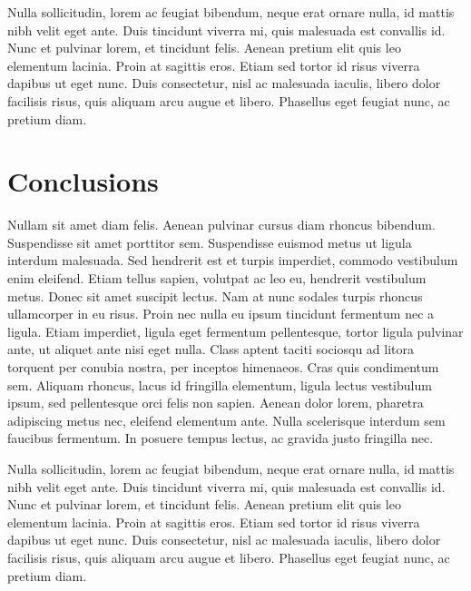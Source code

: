 Nulla sollicitudin, lorem ac feugiat bibendum, neque erat ornare nulla, id
mattis nibh velit eget ante.  Duis tincidunt viverra mi, quis malesuada est
convallis id.  Nunc et pulvinar lorem, et tincidunt felis.  Aenean pretium
elit quis leo elementum lacinia.  Proin at sagittis eros.  Etiam sed tortor
id risus viverra dapibus ut eget nunc.  Duis consectetur, nisl ac malesuada
iaculis, libero dolor facilisis risus, quis aliquam arcu augue et libero. 
Phasellus eget feugiat nunc, ac pretium diam.

\section{Conclusions}
\label{sec:studythree:conclusions}

Nullam sit amet diam felis. Aenean pulvinar cursus diam rhoncus bibendum.
Suspendisse sit amet porttitor sem.  Suspendisse euismod metus ut ligula
interdum malesuada.  Sed hendrerit est et turpis imperdiet, commodo
vestibulum enim eleifend.  Etiam tellus sapien, volutpat ac leo eu,
hendrerit vestibulum metus.  Donec sit amet suscipit lectus.  Nam at nunc
sodales turpis rhoncus ullamcorper in eu risus.  Proin nec nulla eu ipsum
tincidunt fermentum nec a ligula.  Etiam imperdiet, ligula eget fermentum
pellentesque, tortor ligula pulvinar ante, ut aliquet ante nisi eget nulla. 
Class aptent taciti sociosqu ad litora torquent per conubia nostra, per
inceptos himenaeos.  Cras quis condimentum sem.  Aliquam rhoncus, lacus id
fringilla elementum, ligula lectus vestibulum ipsum, sed pellentesque orci
felis non sapien.  Aenean dolor lorem, pharetra adipiscing metus nec,
eleifend elementum ante.  Nulla scelerisque interdum sem faucibus fermentum. 
In posuere tempus lectus, ac gravida justo fringilla nec.

Nulla sollicitudin, lorem ac feugiat bibendum, neque erat ornare nulla, id
mattis nibh velit eget ante.  Duis tincidunt viverra mi, quis malesuada est
convallis id.  Nunc et pulvinar lorem, et tincidunt felis.  Aenean pretium
elit quis leo elementum lacinia.  Proin at sagittis eros.  Etiam sed tortor
id risus viverra dapibus ut eget nunc.  Duis consectetur, nisl ac malesuada
iaculis, libero dolor facilisis risus, quis aliquam arcu augue et libero. 
Phasellus eget feugiat nunc, ac pretium diam.
